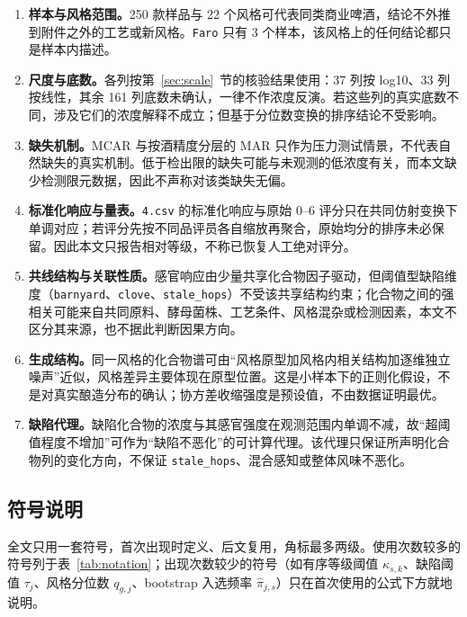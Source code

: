 \documentclass[UTF8,a4paper,zihao=-4]{ctexart}
\numberwithin{figure}{section}
\numberwithin{table}{section}
\numberwithin{equation}{section}
\newcommand{\file}[1]{\texttt{#1}}
\begin{document}
\begin{enumerate}[label=\textbf{\arabic*},leftmargin=3em,itemsep=2pt,topsep=2pt,parsep=0pt]
  \item \textbf{样本与风格范围。}250 款样品与 22 个风格可代表同类商业啤酒，结论不外推到附件之外的工艺或新风格。\file{Faro} 只有 3 个样本，该风格上的任何结论都只是样本内描述。

  \item \textbf{尺度与底数。}各列按第~\ref{sec:scale}~节的核验结果使用：37 列按 log10、33 列按线性，其余 161 列底数未确认，一律不作浓度反演。若这些列的真实底数不同，涉及它们的浓度解释不成立；但基于分位数变换的排序结论不受影响。

  \item \textbf{缺失机制。}MCAR 与按酒精度分层的 MAR 只作为压力测试情景，不代表自然缺失的真实机制。低于检出限的缺失可能与未观测的低浓度有关，而本文缺少检测限元数据，因此不声称对该类缺失无偏。

  \item \textbf{标准化响应与量表。}\file{4.csv} 的标准化响应与原始 0--6 评分只在共同仿射变换下单调对应；若评分先按不同品评员各自缩放再聚合，原始均分的排序未必保留。因此本文只报告相对等级，不称已恢复人工绝对评分。

  \item \textbf{共线结构与关联性质。}感官响应由少量共享化合物因子驱动，但阈值型缺陷维度（\file{barnyard}、\file{clove}、\file{stale\_hops}）不受该共享结构约束；化合物之间的强相关可能来自共同原料、酵母菌株、工艺条件、风格混杂或检测因素，本文不区分其来源，也不据此判断因果方向。

  \item \textbf{生成结构。}同一风格的化合物谱可由“风格原型加风格内相关结构加逐维独立噪声”近似，风格差异主要体现在原型位置。这是小样本下的正则化假设，不是对真实酿造分布的确认；协方差收缩强度是预设值，不由数据证明最优。

  \item \textbf{缺陷代理。}缺陷化合物的浓度与其感官强度在观测范围内单调不减，故“超阈值程度不增加”可作为“缺陷不恶化”的可计算代理。该代理只保证所声明化合物列的变化方向，不保证 \file{stale\_hops}、混合感知或整体风味不恶化。
\end{enumerate}

\subsection{符号说明}

全文只用一套符号，首次出现时定义、后文复用，角标最多两级。使用次数较多的符号列于表~\ref{tab:notation}；出现次数较少的符号（如有序等级阈值 $\kappa_{s,k}$、缺陷阈值 $\tau_j$、风格分位数 $q_{g,j}$、bootstrap 入选频率 $\hat\pi_{j,s}$）只在首次使用的公式下方就地说明。
\end{document}
